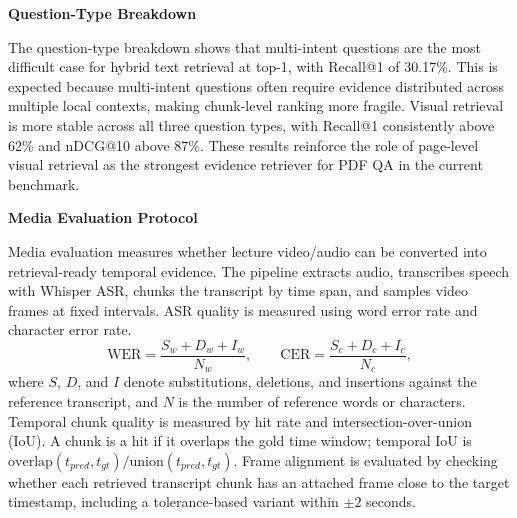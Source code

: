 \textbf{Question-Type Breakdown}

\begin{table}[H]
    \centering
    \caption{Retrieval Performance by Question Type}
    \label{tab:retrieval_by_question_type}
\end{table}

The question-type breakdown shows that multi-intent questions are the most difficult case for hybrid text retrieval at top-1, with Recall@1 of 30.17\%. This is expected because multi-intent questions often require evidence distributed across multiple local contexts, making chunk-level ranking more fragile. Visual retrieval is more stable across all three question types, with Recall@1 consistently above 62\% and nDCG@10 above 87\%. These results reinforce the role of page-level visual retrieval as the strongest evidence retriever for PDF QA in the current benchmark.

\textbf{Media Evaluation Protocol}

Media evaluation measures whether lecture video/audio can be converted into retrieval-ready temporal evidence. The pipeline extracts audio, transcribes speech with Whisper ASR, chunks the transcript by time span, and samples video frames at fixed intervals. ASR quality is measured using word error rate and character error rate.
\[
\mathrm{WER}=\dfrac{S_w+D_w+I_w}{N_w},\qquad
\mathrm{CER}=\dfrac{S_c+D_c+I_c}{N_c},
\]
where $S$, $D$, and $I$ denote substitutions, deletions, and insertions against the reference transcript, and $N$ is the number of reference words or characters. Temporal chunk quality is measured by hit rate and intersection-over-union (IoU). A chunk is a hit if it overlaps the gold time window; temporal IoU is $\mathrm{overlap}(t_{pred},t_{gt})/\mathrm{union}(t_{pred},t_{gt})$. Frame alignment is evaluated by checking whether each retrieved transcript chunk has an attached frame close to the target timestamp, including a tolerance-based variant within $\pm 2$ seconds.


